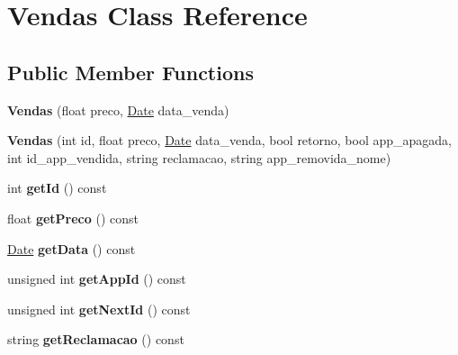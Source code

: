 \hypertarget{class_vendas}{\section{Vendas Class Reference}
\label{class_vendas}
}
\subsection*{Public Member Functions}
\begin{DoxyCompactItemize}
\item 
\hypertarget{class_vendas_a82262941ae2af8e2527d1859ebc7f5cd}{{\bfseries Vendas} (float preco, \hyperlink{class_date}{Date} data\+\_\+venda)}\label{class_vendas_a82262941ae2af8e2527d1859ebc7f5cd}

\item 
\hypertarget{class_vendas_a770db3bf09757d984d4335eae6b25802}{{\bfseries Vendas} (int id, float preco, \hyperlink{class_date}{Date} data\+\_\+venda, bool retorno, bool app\+\_\+apagada, int id\+\_\+app\+\_\+vendida, string reclamacao, string app\+\_\+removida\+\_\+nome)}\label{class_vendas_a770db3bf09757d984d4335eae6b25802}

\item 
\hypertarget{class_vendas_a7e36a98494bec3b57d90afa0536a1be5}{int {\bfseries get\+Id} () const }\label{class_vendas_a7e36a98494bec3b57d90afa0536a1be5}

\item 
\hypertarget{class_vendas_aa5c8bcaced98ded9a22444ddf5935566}{float {\bfseries get\+Preco} () const }\label{class_vendas_aa5c8bcaced98ded9a22444ddf5935566}

\item 
\hypertarget{class_vendas_ab4f3bd058d7cfe6fc837e7804b9b3dcf}{\hyperlink{class_date}{Date} {\bfseries get\+Data} () const }\label{class_vendas_ab4f3bd058d7cfe6fc837e7804b9b3dcf}

\item 
\hypertarget{class_vendas_a26578f098712d9ff4cca17e0d8ac86ab}{unsigned int {\bfseries get\+App\+Id} () const }\label{class_vendas_a26578f098712d9ff4cca17e0d8ac86ab}

\item 
\hypertarget{class_vendas_a3a23da44b124f50b3e73e5f568046695}{unsigned int {\bfseries get\+Next\+Id} () const }\label{class_vendas_a3a23da44b124f50b3e73e5f568046695}

\item 
\hypertarget{class_vendas_a13064baa0f6c550cd433946c96a6d0aa}{string {\bfseries get\+Reclamacao} () const }\label{class_vendas_a13064baa0f6c550cd433946c96a6d0aa}


\end{DoxyCompactItemize}
